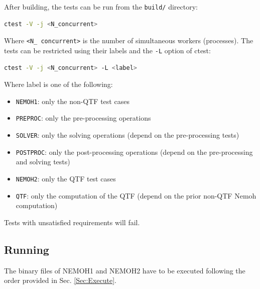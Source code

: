 \documentclass[12pt,a4paper,titlepage]{article}
\begin{document}
\noindent
After building, the tests can be run from the \texttt{build/} directory:
\begin{lstlisting}[language=bash,keywordstyle=\color{blue},basicstyle=\ttfamily\footnotesize,backgroundcolor=\color{lightgray}]
    ctest -V -j <N_concurrent>
\end{lstlisting}

Where \texttt{<N\_ concurrent>} is the number of simultaneous workers (processes). The tests can be restricted using their labels and the \texttt{-L} option of ctest:
\begin{lstlisting}[language=bash,keywordstyle=\color{blue},basicstyle=\ttfamily\footnotesize,backgroundcolor=\color{lightgray}]
    ctest -V -j <N_concurrent> -L <label>
\end{lstlisting}

Where label is one of the following:
\begin{itemize}
    \item \texttt{NEMOH1}: only the non-QTF test cases
    \item \texttt{PREPROC}: only the pre-processing operations
    \item \texttt{SOLVER}: only the solving operations (depend on the pre-processing tests)
    \item \texttt{POSTPROC}: only the post-processing operations (depend on the pre-processing and solving tests)
    \item \texttt{NEMOH2}: only the QTF test cases
    \item \texttt{QTF}: only the computation of the QTF (depend on the prior non-QTF Nemoh computation)
\end{itemize}
Tests with unsatisfied requirements will fail.

\subsection{Running}
The binary files of NEMOH1 and NEMOH2 have to be executed following the order provided in Sec. \ref{Sec:Execute}. %
\end{document}
